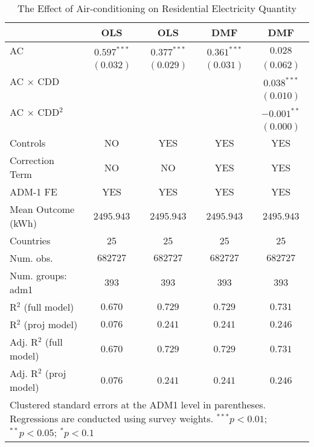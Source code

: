 
\begin{table}[htbp]
\caption{The Effect of Air-conditioning on Residential Electricity Quantity}
\begin{center}
\begin{tabular}{l c c c c}
\hline
 & OLS & OLS & DMF & DMF \\
\hline
AC                      & $0.597^{***}$ & $0.377^{***}$ & $0.361^{***}$ & $0.028$       \\
                        & $(0.032)$     & $(0.029)$     & $(0.031)$     & $(0.062)$     \\
AC $\times$ CDD         &               &               &               & $0.038^{***}$ \\
                        &               &               &               & $(0.010)$     \\
AC $\times$ CDD$^2$     &               &               &               & $-0.001^{**}$ \\
                        &               &               &               & $(0.000)$     \\
\hline
Controls                & NO            & YES           & YES           & YES           \\
Correction Term         & NO            & NO            & YES           & YES           \\
ADM-1 FE                & YES           & YES           & YES           & YES           \\
Mean Outcome (kWh)      & $2495.943$    & $2495.943$    & $2495.943$    & $2495.943$    \\
Countries               & 25            & 25            & 25            & 25            \\
Num. obs.               & $682727$      & $682727$      & $682727$      & $682727$      \\
Num. groups: adm1       & $393$         & $393$         & $393$         & $393$         \\
R$^2$ (full model)      & $0.670$       & $0.729$       & $0.729$       & $0.731$       \\
R$^2$ (proj model)      & $0.076$       & $0.241$       & $0.241$       & $0.246$       \\
Adj. R$^2$ (full model) & $0.670$       & $0.729$       & $0.729$       & $0.731$       \\
Adj. R$^2$ (proj model) & $0.076$       & $0.241$       & $0.241$       & $0.246$       \\
\hline
\multicolumn{5}{l}{\scriptsize{Clustered standard errors at the ADM1 level in parentheses. Regressions are conducted using survey weights. $^{***}p<0.01$; $^{**}p<0.05$; $^{*}p<0.1$}}
\end{tabular}
\label{main: ely_global}
\end{center}
\end{table}
